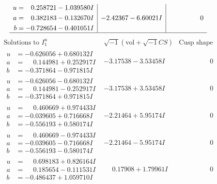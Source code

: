 \documentclass[1p]{elsarticle_modified}
\theoremstyle{definition}
\newcommand{\I}{\sqrt{-1}}
\begin{document}
$$\begin{array}{c|c|c}
\begin{aligned}
u &= \phantom{-}0.258721 - 1.039580 I \\
a &= \phantom{-}0.382183 - 0.132670 I \\
b &= -0.728654 - 0.401051 I\end{aligned}
 & -2.42367 - 6.60021 I & \phantom{-0.000000 } 0\\
 \hline 
 \end{array}$$\newpage$$\begin{array}{c|c|c}  
\text{Solutions to }I^u_{1}& \I (\text{vol} + \sqrt{-1}CS) & \text{Cusp shape}\\
 \hline 
\begin{aligned}
u &= -0.626056 + 0.680132 I \\
a &= \phantom{-}0.144981 + 0.252917 I \\
b &= -0.371864 - 0.971815 I\end{aligned}
 & -3.17538 - 3.53458 I & \phantom{-0.000000 } 0 \\ \hline\begin{aligned}
u &= -0.626056 - 0.680132 I \\
a &= \phantom{-}0.144981 - 0.252917 I \\
b &= -0.371864 + 0.971815 I\end{aligned}
 & -3.17538 + 3.53458 I & \phantom{-0.000000 } 0 \\ \hline\begin{aligned}
u &= \phantom{-}0.460669 + 0.974433 I \\
a &= -0.039605 + 0.716668 I \\
b &= -0.556193 + 0.580174 I\end{aligned}
 & -2.21464 + 5.95174 I & \phantom{-0.000000 } 0 \\ \hline\begin{aligned}
u &= \phantom{-}0.460669 - 0.974433 I \\
a &= -0.039605 - 0.716668 I \\
b &= -0.556193 - 0.580174 I\end{aligned}
 & -2.21464 - 5.95174 I & \phantom{-0.000000 } 0 \\ \hline\begin{aligned}
u &= \phantom{-}0.698183 + 0.826164 I \\
a &= \phantom{-}0.185654 - 0.111531 I \\
b &= -0.486437 + 1.059710 I\end{aligned}
 & \phantom{-}0.17908 + 1.79961 I & \phantom{-0.000000 } 0 \\ \hline\begin{aligned}

\end{aligned}
\end{array}$$
\end{document}
